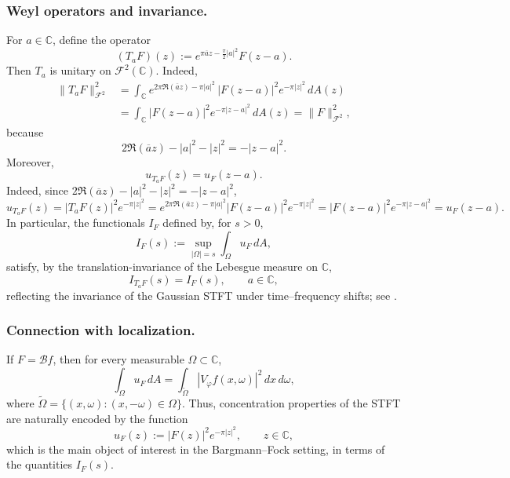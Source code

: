 \documentclass[a4paper,11pt,reqno]{amsart}
\numberwithin{equation}{section}
\theoremstyle{plain} %
\theoremstyle{definition} %
\theoremstyle{remark}
\newcommand{\C}{\mathbb{C}}
\begin{document}
\subsubsection*{Weyl operators and invariance.}
For $a \in \mathbb{C}$, define the operator
\begin{equation}\label{eq:Ta}
(T_a F)(z) := e^{\pi \overline{a} z - \frac{\pi}{2}|a|^2} F(z - a).
\end{equation}
Then $T_a$ is unitary on $\mathcal{F}^2(\mathbb{C})$. Indeed,
\begin{align*}
\|T_aF\|_{\mathcal F^2}^2
&=
\int_{\C} e^{2\pi \Re(\overline{a}z)-\pi |a|^2}\,|F(z-a)|^2 e^{-\pi |z|^2}\,dA(z) \\
&=
\int_{\C} |F(z-a)|^2 e^{-\pi |z-a|^2}\,dA(z)
=
\|F\|_{\mathcal F^2}^2,
\end{align*}
because
\[
2\Re(\overline{a}z)-|a|^2-|z|^2=-|z-a|^2.
\]
Moreover,
\begin{equation}\label{eq:uF-translate}
u_{T_a F}(z) = u_F(z - a).
\end{equation}
Indeed, since
\(2\Re(\overline{a}z)-|a|^2-|z|^2 = -|z-a|^2\),
\begin{equation}\label{eq:u-translation-global}
u_{T_aF}(z)
=
|T_aF(z)|^2e^{-\pi |z|^2}
=
e^{2\pi\Re(\overline{a}z)-\pi|a|^2}|F(z-a)|^2e^{-\pi |z|^2}
=
|F(z-a)|^2e^{-\pi |z-a|^2}=u_F(z-a).
\end{equation}
In particular, the functionals $I_F$ defined by,
for \(s>0\),
\[
I_F(s):=\sup_{|\Omega|=s}\int_\Omega u_F\,dA,
\]
satisfy, by the translation-invariance of the Lebesgue measure on \(\C\),
\begin{equation}\label{eq:I-translation-global}
I_{T_a F}(s) = I_F(s), \qquad a \in \mathbb{C},
\end{equation}
reflecting the invariance of the Gaussian STFT under time--frequency shifts;
see \cite{Daubechies,Grochenig,Kulikov-Oliveira-Ramos,Goncalves-Oliveira-Steinerberger}.

\medskip

\noindent
\subsubsection*{Connection with localization.}
If $F = \mathcal{B}f$, then for every measurable $\Omega \subset \mathbb{C}$,
\[
\int_\Omega u_F \, dA
= \int_{\widetilde{\Omega}} |V_\varphi f(x,\omega)|^2 \, dx\, d\omega,
\]
where $\widetilde{\Omega} = \{(x,\omega) : (x,-\omega) \in \Omega\}$.
Thus, concentration properties of the STFT are naturally encoded by the function
\begin{equation}\label{eq:uF}
u_F(z) := |F(z)|^2 e^{-\pi |z|^2}, \qquad z \in \mathbb{C},
\end{equation}
which is the main object of interest in the Bargmann--Fock setting, in terms of the
quantities $I_F(s)$.
\end{document}
